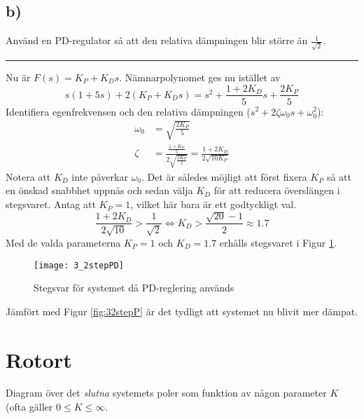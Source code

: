 \documentclass[12pt]{article}
\newcommand{\qline}{\hrule \vspace*{10pt}}
\begin{document}
\subsection*{b)}
Använd en PD-regulator så att den relativa dämpningen blir större än $\frac{1}{\sqrt{2}}$.
\qline
Nu är $F(s) = K_P + K_D s$. Nämnarpolynomet ges nu istället av
\begin{equation*}
  s(1+5s)+2(K_P + K_D s) = s^2 + \frac{1+2K_D}{5}s + \frac{2K_P}{5}
\end{equation*}
Identifiera egenfrekvensen och den relativa dämpningen ($s^2 + 2\zeta\omega_0 s + \omega_0^2$):
\begin{align*}
  \omega_0 &= \sqrt{\frac{2K_P}{5}} \\
  \zeta &= \frac{\frac{1+K_D}{5}}{2\sqrt{\frac{2K_P}{5}}} = \frac{1+2K_D}{2\sqrt{10K_P}}
\end{align*}
Notera att $K_D$ inte påverkar $\omega_0$. Det är således möjligt att först fixera $K_P$ så att en önskad snabbhet uppnås och sedan välja $K_D$ för att reducera överslängen i stegsvaret. Antag att $K_P = 1$, vilket här bara är ett godtyckligt val.
\begin{equation*}
  \frac{1+2K_D}{2\sqrt{10}} > \frac{1}{\sqrt{2}} \Leftrightarrow K_D > \frac{\sqrt{20} - 1}{2} \approx 1.7
\end{equation*}
Med de valda parameterna $K_P = 1$ och $K_D = 1.7$ erhålls stegsvaret i Figur \ref{fig:32stepPD}.

\begin{figure}[h!]
  \centering
  \texttt{[image: 3\_2stepPD]}
  \caption{Stegsvar för systemet då PD-reglering används}
  \label{fig:32stepPD}
\end{figure}
Jämfört med Figur \ref{fig:32stepP} är det tydligt att systemet nu blivit mer dämpat.

\section*{Rotort}
Diagram över det \emph{slutna} systemets poler som funktion av någon parameter $K$ (ofta gäller $0 \leq K \leq \infty$.
\end{document}
